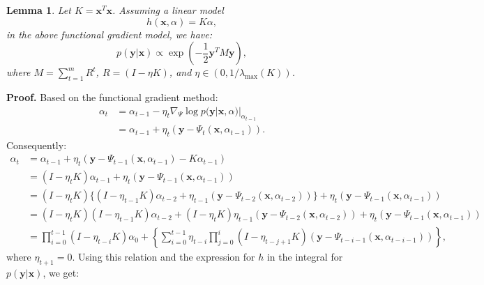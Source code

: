 \documentclass[12pt]{article}
\newtheorem{lemma}{Lemma}[section]
\begin{document}
	\begin{lemma}
		Let $K = \mathbf{x}^T \mathbf{x}$. Assuming a linear model
		\begin{equation}
			h(\mathbf{x}, \alpha) = K \alpha,
		\end{equation}
		in the above functional gradient model, we have:
		\begin{equation}
			p(\mathbf{y}|\mathbf{x}) \propto \exp\left( -\frac{1}{2} \mathbf{y}^T M \mathbf{y} \right),
		\end{equation}
		where $M = \sum_{t=1}^{m} R^t$, $R = (I - \eta K)$, and $\eta \in (0, 1 / \lambda_{\max}(K))$.
	\end{lemma}
	
	\textbf{Proof.} Based on the functional gradient method:
	\begin{align}
		\alpha_t &= \alpha_{t-1} - \eta_t \nabla_\Psi \log p(\mathbf{y}|\mathbf{x}, \alpha)|_{\alpha_{t-1}} \\
		&= \alpha_{t-1} + \eta_t (\mathbf{y} - \Psi_t(\mathbf{x}, \alpha_{t-1})).
	\end{align}
	Consequently:
	\begin{align}
		\alpha_t &= \alpha_{t-1} + \eta_t (\mathbf{y} - \Psi_{t-1}(\mathbf{x}, \alpha_{t-1}) - K \alpha_{t-1}) \\
		&= (I - \eta_t K) \alpha_{t-1} + \eta_t (\mathbf{y} - \Psi_{t-1}(\mathbf{x}, \alpha_{t-1})) \\
		&= (I - \eta_t K) \{ (I - \eta_{t-1} K) \alpha_{t-2} + \eta_{t-1} (\mathbf{y} - \Psi_{t-2}(\mathbf{x}, \alpha_{t-2})) \} + \eta_t (\mathbf{y} - \Psi_{t-1}(\mathbf{x}, \alpha_{t-1})) \\
		&= (I - \eta_t K)(I - \eta_{t-1} K) \alpha_{t-2} + (I - \eta_t K) \eta_{t-1} (\mathbf{y} - \Psi_{t-2}(\mathbf{x}, \alpha_{t-2})) + \eta_t (\mathbf{y} - \Psi_{t-1}(\mathbf{x}, \alpha_{t-1})) \\
		&= \prod_{i=0}^{t-1} (I - \eta_{t-i} K) \alpha_0 + \left\{ \sum_{i=0}^{t-1} \eta_{t-i} \prod_{j=0}^{i} (I - \eta_{t-j+1} K) (\mathbf{y} - \Psi_{t-i-1}(\mathbf{x}, \alpha_{t-i-1})) \right\},
	\end{align}
	where $\eta_{t+1} = 0$. Using this relation and the expression for $h$ in the integral for $p(\mathbf{y}|\mathbf{x})$, we get:
\end{document}

